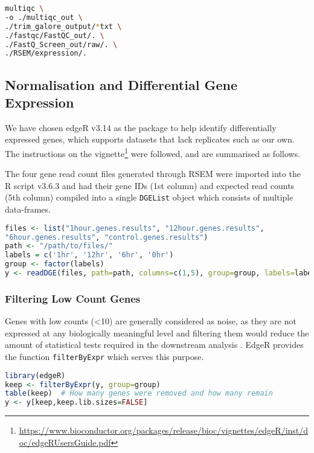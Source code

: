 \begin{lstlisting}[language=bash, caption=MultiQC command]
multiqc \
-o ./multiqc_out \
./trim_galore_output/*txt \
./fastqc/FastQC_out/. \
./FastQ_Screen_out/raw/. \
./RSEM/expression/.
\end{lstlisting}

\subsection{Normalisation and Differential Gene Expression}

We have chosen edgeR v3.14 \citep{edger} as the package to help identify differentially expressed genes, which supports datasets that lack replicates such as our own. The instructions on the vignette\footnote{\url{https://www.bioconductor.org/packages/release/bioc/vignettes/edgeR/inst/doc/edgeRUsersGuide.pdf}} were followed, and are summarised as follows. 

The four gene read count files generated through RSEM were imported into the R script v3.6.3 \citep{R} and had their gene IDs (1st column) and expected read counts (5th column) compiled into a single \texttt{DGEList} object which consists of multiple data-frames. 

\begin{lstlisting}[language=R, caption=Importing count files to R]
files <- list("1hour.genes.results", "12hour.genes.results", 
"6hour.genes.results", "control.genes.results")
path <- "/path/to/files/"
labels = c('1hr', '12hr', '6hr', '0hr')
group <- factor(labels)
y <- readDGE(files, path=path, columns=c(1,5), group=group, labels=labels)
\end{lstlisting}

\subsubsection{Filtering Low Count Genes}

Genes with low counts (<10) are generally considered as noise, as they are not expressed at any biologically meaningful level and filtering them would reduce the amount of statistical tests required in the downstream analysis \citep{law2016rna}. EdgeR provides the function \texttt{filterByExpr} which serves this purpose.

\begin{lstlisting}[language=R, caption=Filtering low count genes]
library(edgeR)
keep <- filterByExpr(y, group=group)
table(keep)  # How many genes were removed and how many remain
y <- y[keep,keep.lib.sizes=FALSE]
\end{lstlisting}


